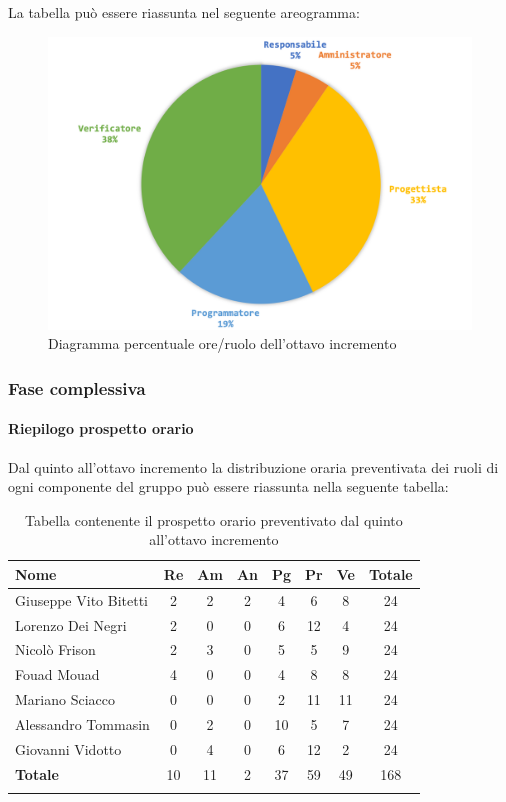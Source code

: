 			La tabella può essere riassunta nel seguente areogramma:
			\begin{figure}[H]
				\centering
				\includegraphics[width=0.8\linewidth]{./images/preventivo/incremento8-2.png}
				\caption{Diagramma percentuale ore/ruolo dell'ottavo incremento}
				\label{fig:diagramma costi ruolo incremento VIII}
			\end{figure}
		\pagebreak
		
		
	\subsubsection{Fase complessiva}
	\paragraph{Riepilogo prospetto orario}
	Dal quinto all'ottavo incremento la distribuzione oraria preventivata dei ruoli di ogni componente del gruppo può essere riassunta nella seguente tabella:
	
	\begin{longtable}{|l|c|c|c|c|c|c|c|}
		\hline
		\rowcolor{lighter-grayer}
		\textbf{Nome} & \textbf{Re} & \textbf{Am} & \textbf{An} & \textbf{Pg}  & \textbf{Pr}   & \textbf{Ve} & \textbf{Totale} \\
		\hline
		\endfirsthead
		
		\hline
		Giuseppe Vito Bitetti 		 & 2 & 2 & 2 & 4 & 6 & 8 & 24\\
		\hline
		\hline
		Lorenzo Dei Negri			 & 2 & 0 & 0 & 6 & 12 & 4 & 24\\
		\hline
		\hline
		Nicolò Frison				    & 2 & 3 & 0 & 5 & 5 & 9 & 24\\
		\hline
		\hline
		Fouad Mouad 				 & 4 & 0 & 0 & 4 & 8 & 8 & 24\\
		\hline
		\hline
		Mariano Sciacco 			 & 0 & 0 & 0 & 2 & 11 & 11 & 24\\
		\hline
		\hline
		Alessandro Tommasin     & 0 & 2 & 0 & 10 & 5 & 7 & 24\\
		\hline
		\hline
		Giovanni Vidotto 			 & 0 & 4 & 0 & 6 & 12 & 2 & 24\\
		\hline 
		\textbf{Totale}			 		& 10 & 11 & 2 & 37 & 59 & 49 & 168\\
		\hline
		\caption{Tabella contenente il prospetto orario preventivato dal quinto all'ottavo incremento}
	\end{longtable}
	
